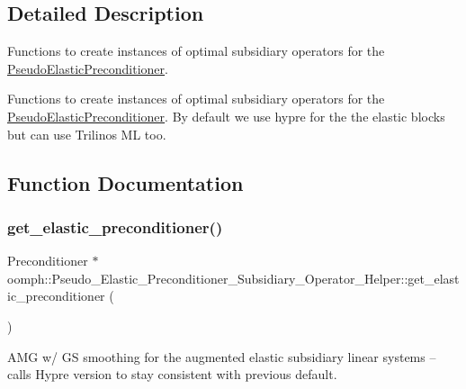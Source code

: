 \subsection{Detailed Description}
Functions to create instances of optimal subsidiary operators for the \hyperlink{classoomph_1_1PseudoElasticPreconditioner}{Pseudo\+Elastic\+Preconditioner}. 

Functions to create instances of optimal subsidiary operators for the \hyperlink{classoomph_1_1PseudoElasticPreconditioner}{Pseudo\+Elastic\+Preconditioner}. By default we use hypre for the the elastic blocks but can use Trilinos ML too. 

\subsection{Function Documentation}
\mbox{\label{namespaceoomph_1_1Pseudo__Elastic__Preconditioner__Subsidiary__Operator__Helper_a89297aa38d1b277fe3db3c0281aa4924}} 
\subsubsection{\texorpdfstring{get\+\_\+elastic\+\_\+preconditioner()}{get\_elastic\_preconditioner()}}
{\footnotesize\ttfamily Preconditioner $\ast$ oomph\+::\+Pseudo\+\_\+\+Elastic\+\_\+\+Preconditioner\+\_\+\+Subsidiary\+\_\+\+Operator\+\_\+\+Helper\+::get\+\_\+elastic\+\_\+preconditioner (\begin{DoxyParamCaption}{ }\end{DoxyParamCaption})}



A\+MG w/ GS smoothing for the augmented elastic subsidiary linear systems -- calls Hypre version to stay consistent with previous default. 



